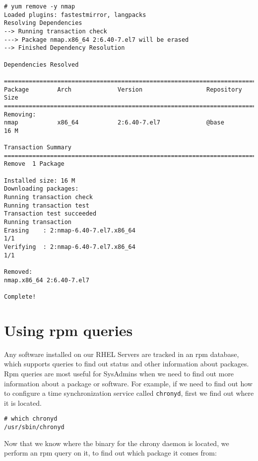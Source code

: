 \vspace{-15pt}
\begin{verbatim}
# yum remove -y nmap
Loaded plugins: fastestmirror, langpacks
Resolving Dependencies
--> Running transaction check
---> Package nmap.x86_64 2:6.40-7.el7 will be erased
--> Finished Dependency Resolution

Dependencies Resolved

================================================================================
Package        Arch             Version                  Repository       Size
================================================================================
Removing:
nmap           x86_64           2:6.40-7.el7             @base            16 M

Transaction Summary
================================================================================
Remove  1 Package

Installed size: 16 M
Downloading packages:
Running transaction check
Running transaction test
Transaction test succeeded
Running transaction
Erasing    : 2:nmap-6.40-7.el7.x86_64                                     1/1 
Verifying  : 2:nmap-6.40-7.el7.x86_64                                     1/1 

Removed:
nmap.x86_64 2:6.40-7.el7                                                      

Complete!
\end{verbatim}
\vspace{-10pt}

	\section{Using rpm queries}
Any software installed on our RHEL Servers are tracked in an rpm database, which supports queries to find out status and other information about packages. Rpm queries are most useful for SysAdmins when we need to find out more information about a package or software. For example, if we need to find out how to configure a time synchronization service called \verb|chronyd|, first we find out where it is located.

\vspace{-15pt}
\begin{verbatim}
# which chronyd
/usr/sbin/chronyd
\end{verbatim}
\vspace{-10pt}

\noindent
Now that we know where the binary for the chrony daemon is located, we perform an rpm query on it, to find out which package it comes from:

